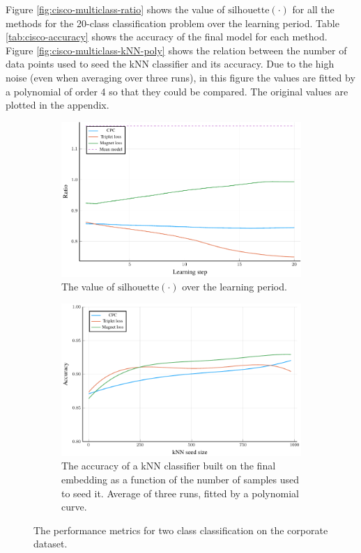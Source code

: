 Figure \ref{fig:cisco-multiclass-ratio} shows the value of \( \mathrm{silhouette} \left( \cdot \right) \) for all the methods for the 20-class classification problem over the learning period. Table \ref{tab:cisco-accuracy} shows the accuracy of the final model for each method. Figure \ref{fig:cisco-multiclass-kNN-poly} shows the relation between the number of data points used to seed the kNN classifier and its accuracy. Due to the high noise (even when averaging over three runs), in this figure the values are fitted by a polynomial of order 4 so that they could be compared. The original values are plotted in the appendix.

\begin{figure}[H]
  \centering
  \begin{subfigure}[t]{0.49\textwidth}
    \centering
    \includegraphics[width=\textwidth]{images/cisco/ratio/cisco-ratio.pdf}
    \caption{The value of \( \mathrm{silhouette} \left( \cdot \right) \) over the learning period.}\label{fig:cisco-ratio}
  \end{subfigure}
  \hfill
  \begin{subfigure}[t]{0.49\textwidth}
    \centering
    \includegraphics[width=\textwidth]{images/cisco/kNN-poly/cisco-kNN-poly.pdf}
    \caption{The accuracy of a kNN classifier built on the final embedding as a function of the number of samples used to seed it. Average of three runs, fitted by a polynomial curve.}\label{fig:cisco-kNN-poly}
  \end{subfigure}
  \caption{The performance metrics for two class classification on the corporate dataset.}
\end{figure}

